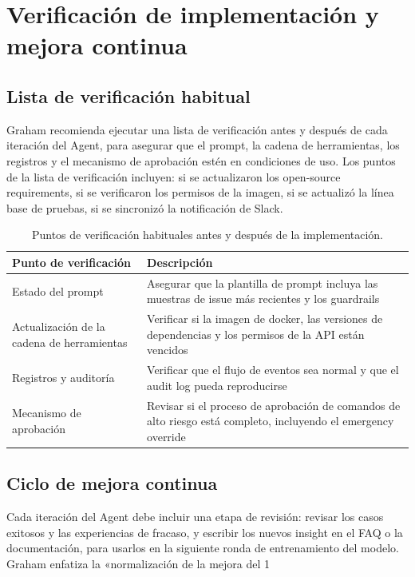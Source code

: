 \section{Verificación de implementación y mejora continua}
\subsection{Lista de verificación habitual}
Graham recomienda ejecutar una lista de verificación antes y después de cada iteración del Agent, para asegurar que el prompt, la cadena de herramientas, los registros y el mecanismo de aprobación estén en condiciones de uso. Los puntos de la lista de verificación incluyen: si se actualizaron los open-source requirements, si se verificaron los permisos de la imagen, si se actualizó la línea base de pruebas, si se sincronizó la notificación de Slack.

\begin{table}[H]
\centering
\begin{tabular}{p{} p{}}
\toprule
Punto de verificación & Descripción \\
\midrule
Estado del prompt & Asegurar que la plantilla de prompt incluya las muestras de issue más recientes y los guardrails \\
\midrule
Actualización de la cadena de herramientas & Verificar si la imagen de docker, las versiones de dependencias y los permisos de la API están vencidos \\
\midrule
Registros y auditoría & Verificar que el flujo de eventos sea normal y que el audit log pueda reproducirse \\
\midrule
Mecanismo de aprobación & Revisar si el proceso de aprobación de comandos de alto riesgo está completo, incluyendo el emergency override \\
\bottomrule
\end{tabular}
\caption{Puntos de verificación habituales antes y después de la implementación.}
\end{table}

\subsection{Ciclo de mejora continua}
Cada iteración del Agent debe incluir una etapa de revisión: revisar los casos exitosos y las experiencias de fracaso, y escribir los nuevos insight en el FAQ o la documentación, para usarlos en la siguiente ronda de entrenamiento del modelo. Graham enfatiza la «normalización de la mejora del 1%


